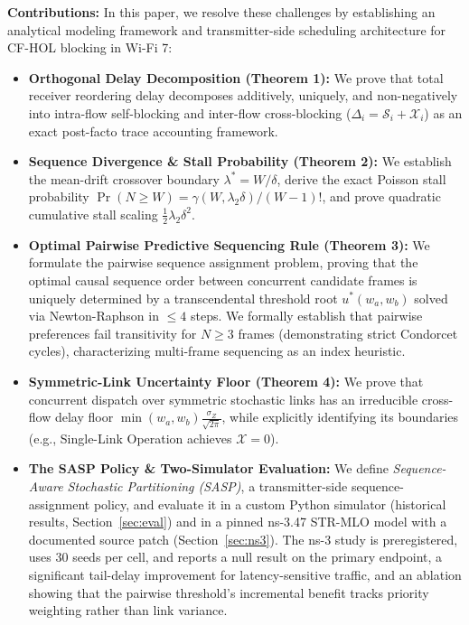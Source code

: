 \documentclass[10pt,journal,compsoc]{IEEEtran}
\begin{document}
\textbf{Contributions:} In this paper, we resolve these challenges by establishing an analytical modeling framework and transmitter-side scheduling architecture for CF-HOL blocking in Wi-Fi 7:
\begin{itemize}
    \item \textbf{Orthogonal Delay Decomposition (Theorem 1):} We prove that total receiver reordering delay decomposes additively, uniquely, and non-negatively into intra-flow self-blocking and inter-flow cross-blocking ($\Delta_i = \mathcal{S}_i + \mathcal{X}_i$) as an exact post-facto trace accounting framework.
    \item \textbf{Sequence Divergence \& Stall Probability (Theorem 2):} We establish the mean-drift crossover boundary $\lambda^* = W / \delta$, derive the exact Poisson stall probability $\Pr(N \ge W) = \gamma(W, \lambda_2 \delta) / (W-1)!$, and prove quadratic cumulative stall scaling $\frac{1}{2} \lambda_2 \delta^2$.
    \item \textbf{Optimal Pairwise Predictive Sequencing Rule (Theorem 3):} We formulate the pairwise sequence assignment problem, proving that the optimal causal sequence order between concurrent candidate frames is uniquely determined by a transcendental threshold root $u^*(w_a, w_b)$ solved via Newton-Raphson in $\le 4$ steps. We formally establish that pairwise preferences fail transitivity for $N \ge 3$ frames (demonstrating strict Condorcet cycles), characterizing multi-frame sequencing as an index heuristic.
    \item \textbf{Symmetric-Link Uncertainty Floor (Theorem 4):} We prove that concurrent dispatch over symmetric stochastic links has an irreducible cross-flow delay floor $\min(w_a, w_b) \frac{\sigma_Z}{\sqrt{2\pi}}$, while explicitly identifying its boundaries (e.g., Single-Link Operation achieves $\mathcal{X}=0$).
    \item \textbf{The SASP Policy \& Two-Simulator Evaluation:} We define \emph{Sequence-Aware Stochastic Partitioning (SASP)}, a transmitter-side sequence-assignment policy, and evaluate it in a custom Python simulator (historical results, Section~\ref{sec:eval}) and in a pinned ns-3.47 STR-MLO model with a documented source patch (Section~\ref{sec:ns3}). The ns-3 study is preregistered, uses 30 seeds per cell, and reports a null result on the primary endpoint, a significant tail-delay improvement for latency-sensitive traffic, and an ablation showing that the pairwise threshold's incremental benefit tracks priority weighting rather than link variance.
\end{itemize}
\end{document}
